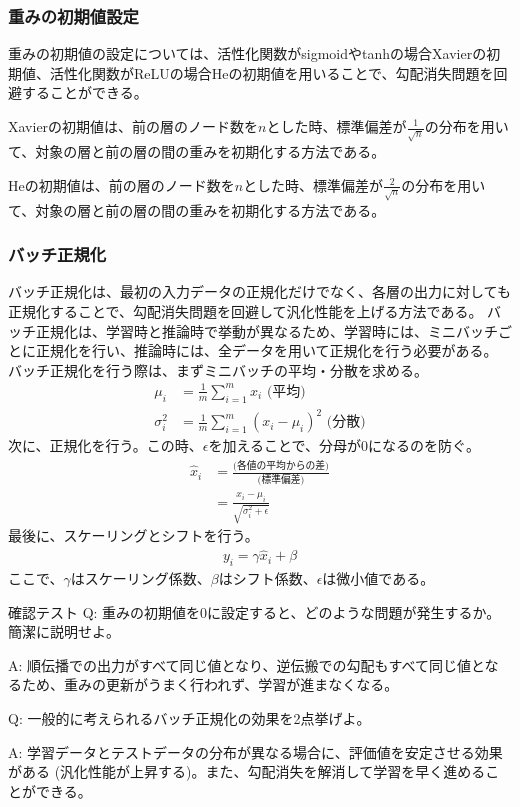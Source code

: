 \documentclass{ltjsarticle}
\begin{document}
\subsubsection{重みの初期値設定}
重みの初期値の設定については、活性化関数がsigmoidやtanhの場合Xavierの初期値、活性化関数がReLUの場合Heの初期値を用いることで、勾配消失問題を回避することができる。
\par
Xavierの初期値は、前の層のノード数を$n$とした時、標準偏差が$\frac{1}{\sqrt{n}}$の分布を用いて、対象の層と前の層の間の重みを初期化する方法である。
\par
Heの初期値は、前の層のノード数を$n$とした時、標準偏差が$\frac{2}{\sqrt{n}}$の分布を用いて、対象の層と前の層の間の重みを初期化する方法である。
\subsubsection{バッチ正規化}
バッチ正規化は、最初の入力データの正規化だけでなく、各層の出力に対しても正規化することで、勾配消失問題を回避して汎化性能を上げる方法である。
バッチ正規化は、学習時と推論時で挙動が異なるため、学習時には、ミニバッチごとに正規化を行い、推論時には、全データを用いて正規化を行う必要がある。
バッチ正規化を行う際は、まずミニバッチの平均・分散を求める。
\begin{align}
  \mu_i &= \frac{1}{m}\sum_{i=1}^{m}x_i \text{  (平均)} \\
  \sigma_i^2 &= \frac{1}{m}\sum_{i=1}^{m}(x_i - \mu_i)^2 \text{  (分散)}
\end{align}
次に、正規化を行う。この時、$\epsilon$を加えることで、分母が0になるのを防ぐ。
\begin{align}
  \hat{x}_i &=\frac{\text{(各値の平均からの差)}}{\text{(標準偏差)}}\\
  &=  \frac{x_i - \mu_i}{\sqrt{\sigma_i^2 + \epsilon}} 
\end{align}
最後に、スケーリングとシフトを行う。
\begin{align} 
  y_i = \gamma \hat{x}_i + \beta
\end{align}
ここで、$\gamma$はスケーリング係数、$\beta$はシフト係数、$\epsilon$は微小値である。


\begin{itembox}[l]{確認テスト}
  Q: 重みの初期値を0に設定すると、どのような問題が発生するか。簡潔に説明せよ。

  A: 順伝播での出力がすべて同じ値となり、逆伝搬での勾配もすべて同じ値となるため、重みの更新がうまく行われず、学習が進まなくなる。

  Q: 一般的に考えられるバッチ正規化の効果を2点挙げよ。

  A: 学習データとテストデータの分布が異なる場合に、評価値を安定させる効果がある (汎化性能が上昇する)。また、勾配消失を解消して学習を早く進めることができる。
\end{itembox}
\end{document}
